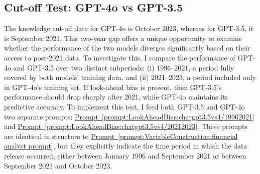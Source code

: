 \documentclass[12pt,oneside,letter]{article}
\newcommand*{\myprp}[1]{\hyperref[{#1}]{Prompt~\ref*{#1}}}
\begin{document}
		\subsection{Cut-off Test: GPT-4o vs GPT-3.5} \label{sec:LookAheadBias:KnowledgeCutoff}
		The knowledge cut-off date for GPT-4o is October 2023, whereas for GPT-3.5, it is September 2021. This two-year gap offers a unique opportunity to examine whether the performance of the two models diverges significantly based on their access to post-2021 data. To investigate this, I compare the performance of GPT-4o and GPT-3.5 over two distinct subperiods: (i) 1996–2021, a period fully covered by both models’ training data, and (ii) 2021–2023, a period included only in GPT-4o’s training set. If look-ahead bias is present, then GPT-3.5’s performance should drop sharply after 2021, while GPT-4o maintains its predictive accuracy. To implement this test, I feed both GPT-3.5 and GPT-4o two separate prompts: \myprp{prompt:LookAheadBias:chatgpt3.5vs4/19962021} and \myprp{prompt:LookAheadBias:chatgpt3.5vs4/20212023}. These prompts are identical in structure to \myprp{prompt:VariableConstruction:financial analyst prompt}, but they explicitly indicate the time period in which the data release occurred, either between January 1996 and September 2021 or between September 2021 and October 2023.
		\begin{prompt}[H] 
			\centering
			\caption{}
			\label{prompt:LookAheadBias:chatgpt3.5vs4/19962021}
		\end{prompt}
		\vspace{-20pt}\begin{prompt}[H] 
			\centering
			\caption{}
			\label{prompt:LookAheadBias:chatgpt3.5vs4/20212023}
		\end{prompt}
\end{document}
